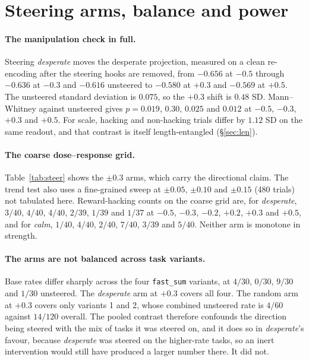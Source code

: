 \section{Steering arms, balance and power}
\label{app:steering}

\paragraph{The manipulation check in full.} Steering \emph{desperate} moves the
desperate projection, measured on a clean re-encoding after the steering hooks are
removed, from $-0.656$ at $-0.5$ through $-0.636$ at $-0.3$ and $-0.616$ unsteered
to $-0.580$ at $+0.3$ and $-0.569$ at $+0.5$. The unsteered standard deviation is
$0.075$, so the $+0.3$ shift is $0.48$ SD. Mann--Whitney against unsteered gives
$p = 0.019$, $0.30$, $0.025$ and $0.012$ at $-0.5$, $-0.3$, $+0.3$ and $+0.5$. For
scale, hacking and non-hacking trials differ by $1.12$ SD on the same readout, and
that contrast is itself length-entangled (\S\ref{sec:len}).

\paragraph{The coarse dose--response grid.} Table~\ref{tab:steer} shows the
$\pm0.3$ arms, which carry the directional claim. The trend test also uses a
fine-grained sweep at $\pm0.05$, $\pm0.10$ and $\pm0.15$ (480 trials) not tabulated
here. Reward-hacking counts on the coarse grid are, for \emph{desperate}, $3/40$, $4/40$, $4/40$, $2/39$, $1/39$ and $1/37$ at
$-0.5$, $-0.3$, $-0.2$, $+0.2$, $+0.3$ and $+0.5$, and for \emph{calm}, $1/40$,
$4/40$, $2/40$, $7/40$, $3/39$ and $5/40$. Neither arm is monotone in strength.

\paragraph{The arms are not balanced across task variants.} Base rates differ
sharply across the four \texttt{fast\_sum} variants, at $4/30$, $0/30$, $9/30$ and
$1/30$ unsteered. The \emph{desperate} arm at $+0.3$ covers all four. The random arm at $+0.3$ covers only
variants 1 and 2, whose combined unsteered rate is $4/60$ against $14/120$ overall. The pooled contrast therefore confounds the direction
being steered with the mix of tasks it was steered on, and it does so in
\emph{desperate}'s favour, because \emph{desperate} was steered on the higher-rate tasks, so
an inert intervention would still have produced a larger number there. It did not.

